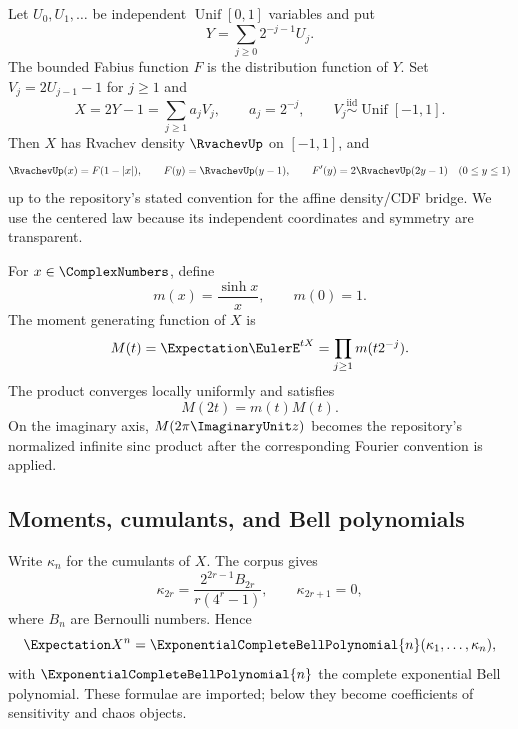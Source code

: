 \documentclass[11pt,oneside]{article}
\theoremstyle{definition}
\theoremstyle{remark}
\begin{document}
Let $U_0,U_1,\ldots$ be independent $\operatorname{Unif}[0,1]$ variables and
put
\begin{equation}
 Y=\sum_{j\ge0}2^{-j-1}U_j.
 \label{eq:Y-Fabius}
\end{equation}
The bounded Fabius function $F$ is the distribution function of $Y$.  Set
$V_j=2U_{j-1}-1$ for $j\ge1$ and
\begin{equation}
 X=2Y-1=\sum_{j\ge1}a_jV_j,
 \qquad a_j=2^{-j},
 \qquad V_j\stackrel{\mathrm{iid}}{\sim}\operatorname{Unif}[-1,1].
 \label{eq:X-centered}
\end{equation}
Then $X$ has Rvachev density $\RvachevUp$ on $[-1,1]$, and
\begin{equation}
 \RvachevUp(x)=F(1-|x|),\qquad F(y)=\RvachevUp(y-1),\qquad F'(y)=2\RvachevUp(2y-1)
 \quad(0\le y\le1)
 \label{eq:F-up-bridge}
\end{equation}
up to the repository's stated convention for the affine density/CDF bridge.
We use the centered law because its independent coordinates and symmetry are
transparent.

For $x\in\ComplexNumbers$, define
\begin{equation}
 m(x)=\frac{\sinh x}{x},\qquad m(0)=1.
 \label{eq:m-sinhc}
\end{equation}
The moment generating function of $X$ is
\begin{equation}
 M(t)=\Expectation\EulerE^{tX}=\prod_{j\ge1}m(t2^{-j}).
 \label{eq:M-product}
\end{equation}
The product converges locally uniformly and satisfies
\begin{equation}
 M(2t)=m(t)M(t).
 \label{eq:M-refinement}
\end{equation}
On the imaginary axis, $M(2\pi\ImaginaryUnit z)$ becomes the repository's normalized
infinite sinc product after the corresponding Fourier convention is applied.

\subsection{Moments, cumulants, and Bell polynomials}

Write $\kappa_n$ for the cumulants of $X$.  The corpus gives
\begin{equation}
 \kappa_{2r}
 =\frac{2^{2r-1}B_{2r}}{r(4^r-1)},
 \qquad \kappa_{2r+1}=0,
 \label{eq:repo-cumulants}
\end{equation}
where $B_n$ are Bernoulli numbers.  Hence
\begin{equation}
 \Expectation X^n=\ExponentialCompleteBellPolynomial{n}(\kappa_1,\ldots,\kappa_n),
 \label{eq:Bell-moments}
\end{equation}
with $\ExponentialCompleteBellPolynomial{n}$ the complete exponential Bell polynomial.  These formulae are
imported; below they become coefficients of sensitivity and chaos objects.
\end{document}
